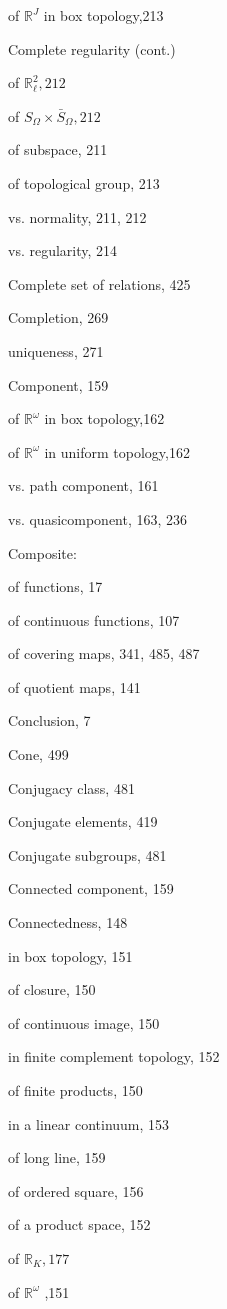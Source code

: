 of \({\mathbb{R}}^{J}\) in box topology,213

Complete regularity (cont.)

of \({\mathbb{R}}_{\ell }^{2},{212}\)

of \({S}_{\Omega } \times  {\bar{S}}_{\Omega },{212}\)

of subspace, 211

of topological group, 213

vs. normality, 211, 212

vs. regularity, 214

Complete set of relations, 425

Completion, 269

uniqueness, 271

Component, 159

of \({\mathbb{R}}^{\omega }\) in box topology,162

of \({\mathbb{R}}^{\omega }\) in uniform topology,162

vs. path component, 161

vs. quasicomponent, 163, 236

Composite:

of functions, 17

of continuous functions, 107

of covering maps, 341, 485, 487

of quotient maps, 141

Conclusion, 7

Cone, 499

Conjugacy class, 481

Conjugate elements, 419

Conjugate subgroups, 481

Connected component, 159

Connectedness, 148

in box topology, 151

of closure, 150

of continuous image, 150

in finite complement topology, 152

of finite products, 150

in a linear continuum, 153

of long line, 159

of ordered square, 156

of a product space, 152

of \({\mathbb{R}}_{K},{177}\)

of \({\mathbb{R}}^{\omega }\) ,151

